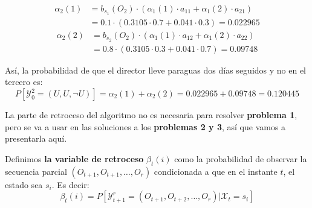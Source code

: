 \begin{exampleth}
\begin{itemize}
    \[
    \begin{aligned}
        \alpha_2(1)&=b_{s_1}(O_2)\cdot\left(\alpha_1(1)\cdot a_{11}+\alpha_1(2)\cdot a_{21} \right)\\
        &=0.1\cdot\left( 0.3105\cdot0.7+0.041\cdot0.3 \right) = 0.022965
    \end{aligned}
    \]
    \[
    \begin{aligned}
        \alpha_2(2)&=b_{s_2}(O_2)\cdot\left(\alpha_1(1)\cdot a_{12}+\alpha_1(2)\cdot a_{22} \right)\\
        &=0.8\cdot\left(0.3105\cdot0.3+0.041\cdot0.7\right)=0.09748
    \end{aligned}
    \]
\end{itemize}
Así, la probabilidad de que el director lleve paraguas dos días seguidos y no en el tercero es:
\[P[\mathcal{Y}_0^2=(U,U,\neg U)]=\alpha_2(1)+\alpha_2(2)=0.022965+0.09748=0.120445\]
\end{exampleth}

La parte de retroceso del algoritmo no es necesaria para resolver \textbf{problema 1}, pero se va a usar en las soluciones a los \textbf{problemas 2 y 3}, así que vamos a presentarla aquí. 

\begin{definition}
Definimos \textbf{la variable de retroceso} $\beta_t(i)$ como la probabilidad de observar la secuencia parcial $(O_{t+1},O_{t+1},\dots,O_{r})$ condicionada a que en el instante $t$, el estado sea $s_i$. Es decir:
\[\beta_t(i)=P[\mathcal{Y}_{t+1}^r=(O_{t+1},O_{t+2},\dots,O_{r})|\mathcal{X}_t=s_i]\]
\end{definition}

